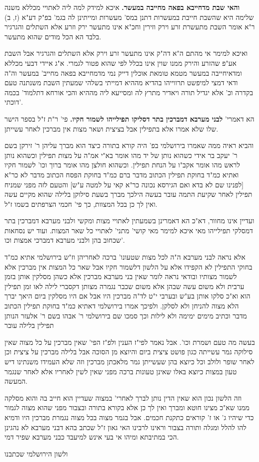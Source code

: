 \documentclass[12pt, openany]{book}
\newcommand{\sethebfont}{
\fontsize{10.5pt}{21.0pt} \selectfont
}
\newcommand{\twocol}[1]{
	{\sethebfont \begin{multicols}{2}
			#1
	\end{multicols}}	
}
\begin{document}
\twocol{\textbf{והאי שבת מדחייבא בפאה מחייבה במעשר.}  איכא למידק למה ליה לאתויי מכללא משנה שלימה היא שהשבת חייבת במעשרות דתנן במס' מעשרות ומייתינן לה בגמ' בפ"ק דע"א (ז, ב) ר"א אומר השבת מתעשרת זרע וירק וזירין וחכ"א אינו מתעשר ירק וזרע אלא השתלים והגרגיר בלבד הא הכל מודים שהוא מתעשר.\par ואיכא למימר אי מהתם ה"א דה"ק אינו מתעשר זרע וירק אלא השתלים והגרגיר אבל השבת אע"פ שהזרע והירק ממנו שוין אינו בכלל לפי שהוא פטור לגמרי. א"ג איידי דבעי מכללא ומדאיחייבה במעשר מטמא טומאת אוכלין דייק נמי מדמחייבא בפאה מחייב' במעשר וה"ה ודאי דמצי למיפשט תרווייהו בהדיא מההיא דמייתי בשלהי שמעתין השבת משנתנה טעם בקדרה וכ' אלא יגדיל תורה ויאדיר מתרץ לה ומסייעא ליה מההיא והכי אורחא דתלמוד' בכמה דוכתי'. 
\par הא דאמרי' \textbf{לבני מערבא דמברכין בתר דסליקו תפילייהו לשמור חקיו.}  פי' ר"ת ז"ל בספר הישר שלו שלא אמרו אלא בתפילין אבל בציצית ושאר מצות אין מברכין לאחר עשייתן.\par  והביא ראיה ממה שאמרו בירושלמי בפ' היה קורא בתורה כיצד הוא מברך עליהן ר' זירקן בשם ר' יעקב בר אידי כשהוא נותן של יד מהו אומר בא"י אמ"ה על מצות תפילין וכשהוא נותן לראש מהו אומר אקב"ו על הנחת תפילין. וכשהוא חולצן מהו אומר ברוך וכו' לשמור חקיו ואתיא כמ"ד בחוקת תפילין הכתוב מדבר ברם כמ"ד בחוקת הפסח הכתוב מדבר לא כר"א [{\small לפנינו שם }  לא בדא {\small ואם הגירסא נכונה }  כר"א קאי על למטה ע"ש] והטעם לזה מפני שמניח תפילין לאחר שקיעת התמה עובר בעשה הילכך מברך בשעת סילוקן בלילה שהוא מקיים עשה ואין לך כן בכל המצוות, כך פי' חכמי הצרפתים בשמו ז"ל.\par ועדיין אינו מחוור, דא"כ הא דאמרינן בשמעתין לאתויי מצות ומקשי ולבני מערבא דמברכין בתר דמסלקי תפילייהו מאי איכא למימר מאי קושי' מתני' לאתויי כל שאר המצות. ועוד יש נסחאות שכחוב בהן ולבני מערבא דמברכי אמצות וכו'.\par  אלא נראה לבני מערבא ה"ה לכל מצות שטעונו' ברכה לאחריהן וז"ש בירושלמי אתיא כמ"ד בחוקי התפילין לא הקפידו אלא על הלשון דלשמור חקיו אבל שאר כל המצות אין מברכין אלא לשמור מצותיו ובודאי נראה לומר שאין בני מערבא מברכין אלא כשהן מסלקין אותן בזמן ערבית ולא משום עשה שבהן אלא משום שכבר נגמרה מצותן דקסברי לילה לאו זמן תפילין הוא וא"כ סלקו אותן בע"ש ובערבי י"ט לד"ה מברכין היו אבל אם היו מסלקין ביום היאך יברך הלא מצוה להניחן ולא לסלקן. ולפיכך אמרו בירושלמי דאתיא כמ"ד בחוקת תפילין הכתוב מדבר וכתיב מימים ימימה ולא לילות וכך סמכו שם בירושלמי ר' אבהו בשם ר' אלעזר הנותן תפילין בלילה עובר\par בעשה מה טעם ושמרת וכו'. אבל נאמר לפי"ז הענין ולפ"ז הפי' שאין מברכין על כל מצוה שאין סילוקה גמר עשייתה כגון פושט ציצית ביום והיוצא מן הסוכה אבל בלילה מברכין על ציצית וכן לאחר שופר ולולב וכל כיוצא בהן שעשייתן גמר מלאכתן מברכין וזה שלא העמידו משנתינו דיש טעון במצות כיוצא באלו שאינן טעונות ברכה מפני שאין לשין לאחריו אלא לאחר שנגמר המעשה.\par וזה הלשון נכון הוא שאין הדין נותן לברך לאחרי' במצוה שעדיין הוא חייב בה והוא מסלקה ממנו שא"כ מצינו חוטא ומברך ואין לך כן אלא בקורא בתורה ובצבור מפני שהוא מצוה לגמור כדי שיהיו ג' או ז' קוראים כתקנת חכמים. אבל בגמר מצוה בכל מצוה נגמרת מברכין היו ודמיא להו להלל ומגלה ותורה בצבור וראינו לרבינו האי גאון ז"ל שכתב בהא דבני מערבא לא נהגינן הכי במתיבתא ומיהו אי בעי אינש למיעבד כבני מערבא שפיר דמי.\par ולשון הירושלמי שכתבנו }
\end{document}
